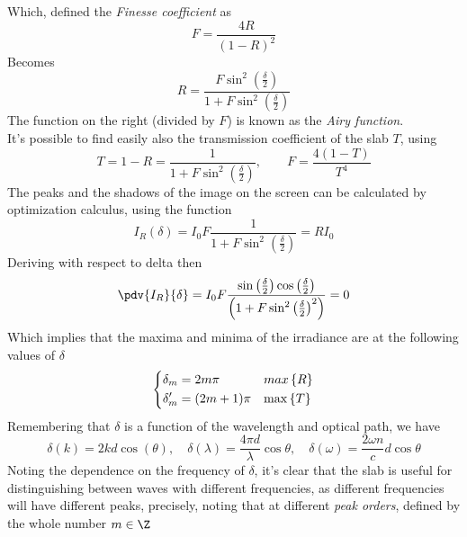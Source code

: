 \documentclass[../electromagnetism.tex]{subfiles}
\begin{document}
Which, defined the \textit{Finesse coefficient} as
\begin{equation}
	F=\frac{4R}{(1-R)^2}
	\label{eq:finesse.mbi}
\end{equation}
Becomes
\begin{equation}
	R=\frac{F\sin^2\left( \frac{\delta}{2} \right)}{1+F\sin^2\left( \frac{\delta}{2} \right)}
	\label{eq:refcoefffinesse.mbi}
\end{equation}
The function on the right (divided by $F$) is known as the \textit{Airy function}.\\
It's possible to find easily also the transmission coefficient of the slab $T$, using
\begin{equation}
	T=1-R=\frac{1}{1+F\sin^2\left( \frac{\delta}{2} \right)}, \qquad F=\frac{4(1-T)}{T^4}
	\label{eq:transcoefffinesse.mbi}
\end{equation}
The peaks and the shadows of the image on the screen can be calculated by optimization calculus, using the function
\begin{equation*}
	I_R(\delta)=I_0F\frac{1}{1+F\sin^2\left( \frac{\delta}{2} \right)}=RI_0
\end{equation*}
Deriving with respect to delta then
\begin{equation*}
	\pdv{I_R}{\delta}=I_0F\frac{\sin\left( \frac{\delta}{2} \right)\cos\left( \frac{\delta}{2} \right)}{\left( 1+F\sin^2\left( \frac{\delta}{2} \right)^2 \right)}=0
\end{equation*}
Which implies that the maxima and minima of the irradiance are at the following values of $\delta$
\begin{equation}
	\begin{dcases}
		\delta_m=2m\pi&max\left\{ R \right\}\\
		\delta_m'=(2m+1)\pi&\max\left\{ T \right\}
	\end{dcases}
	\label{eq:maximaminimaI.mbi}
\end{equation}
Remembering that $\delta$ is a function of the wavelength and optical path, we have
\begin{equation*}
	\delta(k)=2kd\cos(\theta), \quad\delta(\lambda)=\frac{4\pi d}{\lambda}\cos\theta, \quad\delta(\omega)=\frac{2\omega n}{c}d\cos\theta
\end{equation*}
Noting the dependence on the frequency of $\delta$, it's clear that the slab is useful for distinguishing between waves with different frequencies, as different frequencies will have different peaks, precisely, noting that at different \textit{peak orders}, defined by the whole number $m\in\Z$
\end{document}
